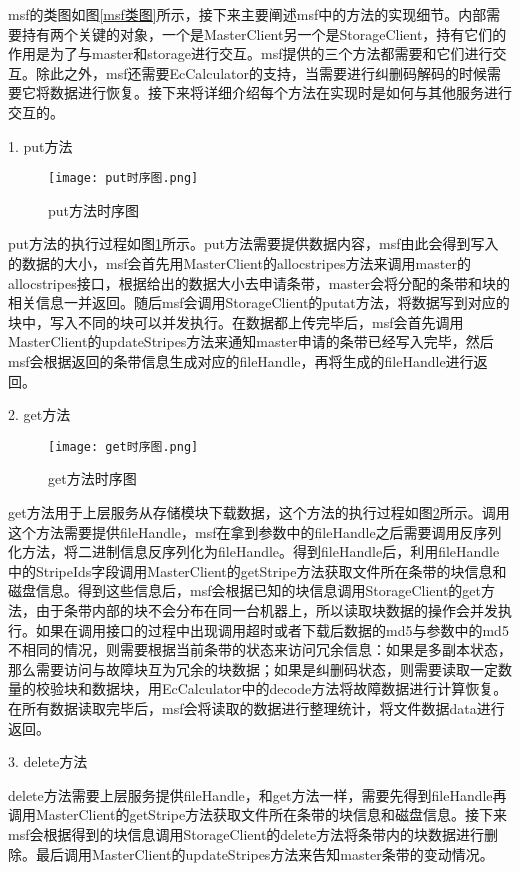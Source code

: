 msf的类图如图\ref{msf类图}所示，接下来主要阐述msf中的方法的实现细节。内部需要持有两个关键的对象，一个是MasterClient另一个是StorageClient，持有它们的作用是为了与master和storage进行交互。msf提供的三个方法都需要和它们进行交互。除此之外，msf还需要EcCalculator的支持，当需要进行纠删码解码的时候需要它将数据进行恢复。接下来将详细介绍每个方法在实现时是如何与其他服务进行交互的。

1. put方法

\begin{figure}[h]
  \centering
  \texttt{[image: put时序图.png]}
  \caption{put方法时序图}
  \label{put方法时序图}
\end{figure}

put方法的执行过程如图\ref{put方法时序图}所示。put方法需要提供数据内容，msf由此会得到写入的数据的大小，msf会首先用MasterClient的allocstripes方法来调用master的allocstripes接口，根据给出的数据大小去申请条带，master会将分配的条带和块的相关信息一并返回。随后msf会调用StorageClient的putat方法，将数据写到对应的块中，写入不同的块可以并发执行。在数据都上传完毕后，msf会首先调用MasterClient的updateStripes方法来通知master申请的条带已经写入完毕，然后msf会根据返回的条带信息生成对应的fileHandle，再将生成的fileHandle进行返回。

2. get方法

\begin{figure}[h]
  \centering
  \texttt{[image: get时序图.png]}
  \caption{get方法时序图}
  \label{get方法时序图}
\end{figure}

get方法用于上层服务从存储模块下载数据，这个方法的执行过程如图\ref{get方法时序图}所示。调用这个方法需要提供fileHandle，msf在拿到参数中的fileHandle之后需要调用反序列化方法，将二进制信息反序列化为fileHandle。得到fileHandle后，利用fileHandle中的StripeIds字段调用MasterClient的getStripe方法获取文件所在条带的块信息和磁盘信息。得到这些信息后，msf会根据已知的块信息调用StorageClient的get方法，由于条带内部的块不会分布在同一台机器上，所以读取块数据的操作会并发执行。如果在调用接口的过程中出现调用超时或者下载后数据的md5与参数中的md5不相同的情况，则需要根据当前条带的状态来访问冗余信息：如果是多副本状态，那么需要访问与故障块互为冗余的块数据；如果是纠删码状态，则需要读取一定数量的校验块和数据块，用EcCalculator中的decode方法将故障数据进行计算恢复。在所有数据读取完毕后，msf会将读取的数据进行整理统计，将文件数据data进行返回。

3. delete方法

delete方法需要上层服务提供fileHandle，和get方法一样，需要先得到fileHandle再调用MasterClient的getStripe方法获取文件所在条带的块信息和磁盘信息。接下来msf会根据得到的块信息调用StorageClient的delete方法将条带内的块数据进行删除。最后调用MasterClient的updateStripes方法来告知master条带的变动情况。

